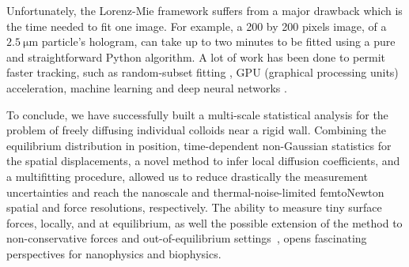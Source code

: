 Unfortunately, the Lorenz-Mie framework suffers from a major drawback which is the time needed to fit one image. For example, a 200 by 200 pixels image, of a $2.5 ~ \mathrm{\mu m}$ particle's hologram, can take up to two minutes to be fitted using a pure and straightforward Python algorithm. A lot of work has been done to permit faster tracking, such as random-subset fitting \cite{dimiduk_random-subset_2014}, GPU (graphical processing units) acceleration, machine learning \cite{yevick_machine-learning_2014, hannel_machine-learning_2018} and deep neural networks \cite{altman_catch_2020}.

To conclude, we have successfully built a multi-scale statistical analysis for the problem of freely diffusing individual colloids near a rigid wall. Combining the equilibrium distribution in position, time-dependent non-Gaussian statistics for the spatial displacements, a novel method to infer local diffusion coefficients, and a multifitting procedure, allowed us to reduce drastically the measurement uncertainties and reach the nanoscale and thermal-noise-limited femtoNewton spatial and force resolutions, respectively. The ability to measure tiny surface forces, locally, and at equilibrium, as well the possible extension of the method to non-conservative forces and out-of-equilibrium settings~\cite{amarouchene_nonequilibrium_2019, mangeat_role_2019}, opens fascinating perspectives for nanophysics and biophysics.

